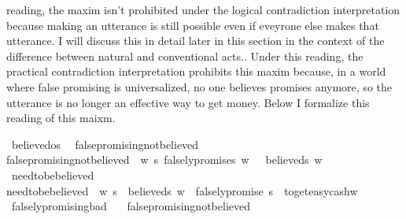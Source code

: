 \begin{isabellebody}
\begin{isamarkuptext}
{reading, the maxim isn't prohibited under the logical contradiction interpretation because making an 
utterance is still possible even if eveyrone else makes that utterance. I will discuss this in detail 
later in this section in the context of the difference between natural and conventional acts.}. 
Under this reading, the practical contradiction interpretation prohibits this maxim because, in a world 
where false promising is universalized, no one believes promises anymore, so the utterance is no longer 
an effective way to get money. Below I formalize this reading of this maixm.%
\end{isamarkuptext}\isamarkuptrue%
\isamarkupfalse%
\ believed{\isacharcolon}{\isacharcolon}os\ \isanewline
{}\isamarkupfalse%
\ false{\isacharunderscore}promising{\isacharunderscore}not{\isacharunderscore}believed\ \ \isanewline
{\isachardoublequoteopen}false{\isacharunderscore}promising{\isacharunderscore}not{\isacharunderscore}believed\ {\isasymequiv}\ {\isasymforall}w\ s{\isachardot}\ {\isacharparenleft}falsely{\isacharunderscore}promise{\isacharparenleft}s{\isacharparenright}\ w\ {\isasymlongrightarrow}\ {\isasymnot}\ believed{\isacharparenleft}s{\isacharparenright}\ w{\isacharparenright}{\isachardoublequoteclose}\isanewline
%
\isanewline
\isanewline
{}\isamarkupfalse%
\ need{\isacharunderscore}to{\isacharunderscore}be{\isacharunderscore}believed\ \ \isanewline
{\isachardoublequoteopen}need{\isacharunderscore}to{\isacharunderscore}be{\isacharunderscore}believed\ {\isasymequiv}\ {\isasymforall}w\ s{\isachardot}\ {\isacharparenleft}{\isasymnot}\ believed{\isacharparenleft}s{\isacharparenright}\ w\ {\isasymlongrightarrow}\ \isactrlbold {\isasymnot}{\isacharparenleft}{\isacharparenleft}falsely{\isacharunderscore}promise\ s{\isacharparenright}\ \isactrlbold {\isasymrightarrow}\ to{\isacharunderscore}get{\isacharunderscore}easy{\isacharunderscore}cash{\isacharparenright}w{\isacharparenright}{\isachardoublequoteclose}\isanewline
%
\isanewline
\isanewline
{}\isamarkupfalse%
\ falsely{\isacharunderscore}promising{\isacharunderscore}bad{\isacharunderscore}{}{\isacharcolon}\isanewline
\ \ \ false{\isacharunderscore}promising{\isacharunderscore}not{\isacharunderscore}believed\isanewline

\end{isabellebody}
